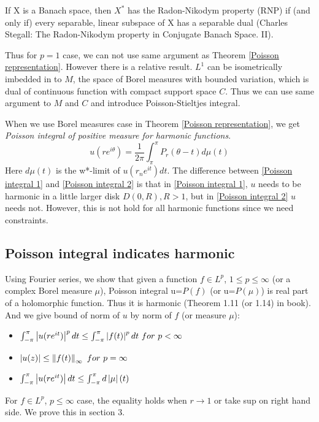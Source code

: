 \begin{remark}
    {\color{blue} If X is a Banach space, then $X^*$ has the Radon-Nikodym property (RNP) if (and only if) every separable, linear
        subspace of X has a separable dual (Charles Stegall: The Radon-Nikodym property in Conjugate Banach Space. II)}.
\end{remark}
Thus for $p=1$ case, we can not use same argument as Theorem \ref{Poisson representation}. However there is a relative result. $L^1$ can be isometrically imbedded
in to $M$, the space of Borel measures with bounded variation, which is dual of continuous function with compact support space $C$. Thus we can use same argument to $M$ and $C$ and introduce Poisson-Stieltjes integral.\par
When we use Borel measures case in Theorem \ref{Poisson representation}, we get \emph{Poisson integral of positive measure for harmonic functions}.
\begin{equation}
    u(re^{i\theta})=\frac{1}{2\pi}\int_\pi^\pi{P_r(\theta-t)d\mu(t)} \label{Poisson integral 2}
\end{equation}
Here $d\mu(t)$ is the w*-limit of $u(r_ne^{it})d t$. The difference between \eqref{Poisson integral 1} and \eqref{Poisson integral 2} is that in \eqref{Poisson integral 1}, $u$ needs to be harmonic in a little larger
disk $D(0,R),R>1$, but in \eqref{Poisson integral 2} $u$ needs not. However, this is not hold for all  harmonic functions since we need constraints.\par

\subsection{Poisson integral indicates harmonic}\label{Poisson integral indicates harmonic}
Using Fourier series, we show that given a function $f\in L^p$, $1\leq p\leq \infty$ (or a complex Borel measure $\mu$), Poisson integral u=$P(f)$ (or u=$P(\mu)$) is real part of a holomorphic function. Thus it is harmonic (Theorem 1.11 (or 1.14) in book). And we give bound of norm of $u$ by norm of $f$ (or measure $\mu$):
\begin{itemize}
    \item $\int_{-\pi}^{\pi}\left\lvert u(re^{i t})\right\rvert^p d t \leq \int_{-\pi}^{\pi}\left\lvert f(t)\right\rvert^p d t~for~p<\infty$
    \item $\left\lvert u(z)\right\rvert\leq \left\lVert f(t)\right\rVert_\infty~for~p=\infty$
    \item $\int_{-\pi}^{\pi}\left\lvert u(re^{i t})\right\rvert d t \leq \int_{-\pi}^{\pi}d\left\lvert\mu\right\rvert(t)$
\end{itemize}
For $f\in L^p$, $p\leq\infty$ case, the equality holds when $r\to 1$ or take sup on right hand side. We prove this in section 3.
